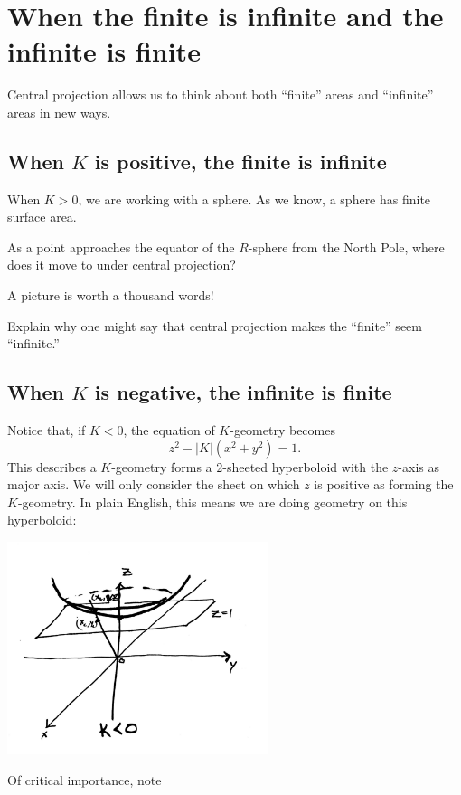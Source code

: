\documentclass{ximera}
\begin{document}
\section{When the finite is infinite and the infinite is finite}

Central projection allows us to think about both ``finite'' areas and
``infinite'' areas in new ways.

\subsection{When $K$ is positive, the finite is infinite}

When $K>0$, we are working with a sphere. As we know, a sphere has
finite surface area.

\begin{problem}
  As a point approaches the equator of the $R$-sphere from the North
  Pole, where does it move to under central projection?
  \begin{hint}
    A picture is worth a thousand words!
  \end{hint}
  \begin{freeResponse}
  \end{freeResponse}
\end{problem}

\begin{problem}
  Explain why one might say that central projection makes the
  ``finite'' seem ``infinite.''
    \begin{freeResponse}
    \end{freeResponse}
\end{problem}


\subsection{When $K$ is negative, the infinite is finite}


Notice that, if $K<0$, the equation of $K$-geometry becomes
\[
z^{2}-|K|\left(x^{2}+y^{2}\right)  =1.
\]
This describes a $K$-geometry forms a $2$-sheeted hyperboloid with the
$z$-axis as major axis. We will only consider the sheet on which $z$
is positive as forming the $K$-geometry. In plain English, this means
we are doing geometry on this hyperboloid:
\begin{image}
\includegraphics[width=3in]{UpperHyperboloid.png}
\end{image}
Of critical importance, note
\end{document}

